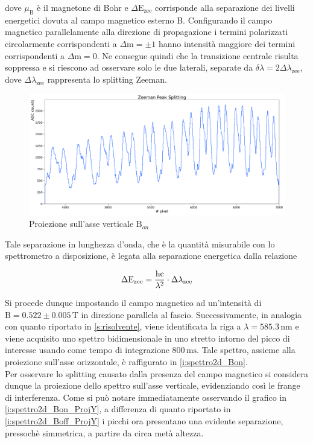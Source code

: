 \documentclass[twocolumn,10pt]{asme2ej}
\begin{document}
dove $\mu_{\text{B}}$ è il magnetone di Bohr e $\Delta \text{E}_{\text{zee}}$ corrisponde alla separazione dei livelli
energetici dovuta al campo magnetico esterno B. Configurando il campo magnetico parallelamente alla direzione di
propagazione i termini polarizzati circolarmente corrispondenti a $\Delta \text{m} = \pm 1$ hanno intensità maggiore dei
termini corrispondenti a $\Delta \text{m} = 0$. Ne consegue quindi che la transizione centrale risulta soppressa e si
riescono ad osservare solo le due laterali, separate da $\delta\lambda = 2 \Delta\lambda_{\text{zee}}$, dove
$\Delta\lambda_{\text{zee}}$ rappresenta lo splitting Zeeman. 

\begin{figure}
    \centering
    \includegraphics[width=\textwidth]{../Plots/Bon_Y_proj.png}
    \caption{Proiezione sull'asse verticale $\text{B}_{on}$}
    \label{i:spettro2d_Bon_ProjY}
\end{figure}

\noindent Tale separazione in lunghezza d'onda, che è la quantità misurabile con lo spettrometro a disposizione, è legata alla
separazione energetica dalla relazione

\vspace{-15pt}
\begin{equation}
    \Delta \text{E}_{\text{zee}} = \frac{\text{hc}}{\lambda^2} \cdot \Delta\lambda_{\text{zee}}
    \label{e:dEzee}
\vspace{-5pt}
\end{equation}

Si procede dunque impostando il campo magnetico ad un'intensità di $\text{B} = 0.522 \pm 0.005 \,\si{\tesla}$ in
direzione parallela al fascio. Successivamente, in analogia con quanto riportato in \autoref{s:risolvente}, viene
identificata la riga a $\lambda = 585.3 \,\si{\nano\metre}$ e viene acquisito uno spettro bidimensionale in uno stretto
intorno del picco di interesse usando come tempo di integrazione $800\,\si{\milli\second}$. Tale spettro, assieme alla
proiezione sull'asse orizzontale, è raffigurato in \autoref{i:spettro2d_Bon}. \\
Per osservare lo splitting causato dalla presenza del campo magnetico si considera dunque la proiezione dello spettro
sull'asse verticale, evidenziando così le frange di interferenza. Come si può notare immediatamente osservando il
grafico in \autoref{i:spettro2d_Bon_ProjY}, a differenza di quanto riportato in \autoref{i:spettro2d_Boff_ProjY} i
picchi ora presentano una evidente separazione, pressochè simmetrica, a partire da circa metà altezza. 
\end{document}
